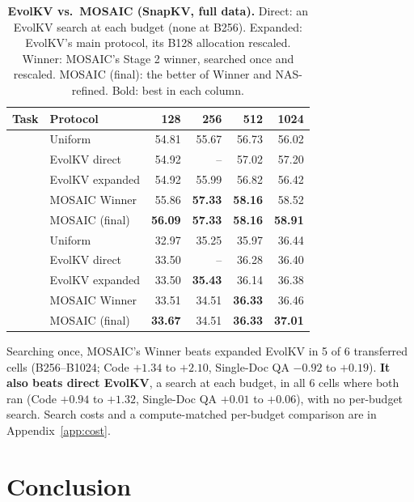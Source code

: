 \documentclass[11pt]{article}
\begin{document}
\begin{table}[t]
  \centering
  \footnotesize
  \setlength{\tabcolsep}{2.8pt}
  \renewcommand{\arraystretch}{0.92}
  \begin{tabular}{@{} c l rrrr @{}}
    \toprule
    \textbf{Task} & \textbf{Protocol} & \textbf{128} & \textbf{256} & \textbf{512} & \textbf{1024} \\
    \midrule
     & Uniform & 54.81 & 55.67 & 56.73 & 56.02 \\
     & EvolKV direct & 54.92 & -- & 57.02 & 57.20 \\
     & EvolKV expanded & 54.92 & 55.99 & 56.82 & 56.42 \\
     & MOSAIC Winner & 55.86 & \textbf{57.33} & \textbf{58.16} & 58.52 \\
     & MOSAIC (final) & \textbf{56.09} & \textbf{57.33} & \textbf{58.16} & \textbf{58.91} \\
    \midrule
     & Uniform & 32.97 & 35.25 & 35.97 & 36.44 \\
     & EvolKV direct & 33.50 & -- & 36.28 & 36.40 \\
     & EvolKV expanded & 33.50 & \textbf{35.43} & 36.14 & 36.38 \\
     & MOSAIC Winner & 33.51 & 34.51 & \textbf{36.33} & 36.46 \\
     & MOSAIC (final) & \textbf{33.67} & 34.51 & \textbf{36.33} & \textbf{37.01} \\
    \bottomrule
  \end{tabular}
  \caption{\textbf{EvolKV vs.\ MOSAIC (SnapKV, full data).} Direct: an EvolKV search at each budget (none at B256). Expanded: EvolKV's main protocol, its B128 allocation rescaled. Winner: MOSAIC's Stage 2 winner, searched once and rescaled. MOSAIC (final): the better of Winner and NAS-refined. Bold: best in each column.}
  \label{tab:ablation}
\end{table}

Searching once, MOSAIC's Winner beats expanded EvolKV in 5 of 6 transferred cells (B256--B1024; Code $+1.34$ to $+2.10$, Single-Doc QA $-0.92$ to $+0.19$). \textbf{It also beats direct EvolKV}, a search at each budget, in all 6 cells where both ran (Code $+0.94$ to $+1.32$, Single-Doc QA $+0.01$ to $+0.06$), with no per-budget search. Search costs and a compute-matched per-budget comparison are in Appendix~\ref{app:cost}. 

\FloatBarrier
\section{Conclusion}
\end{document}
